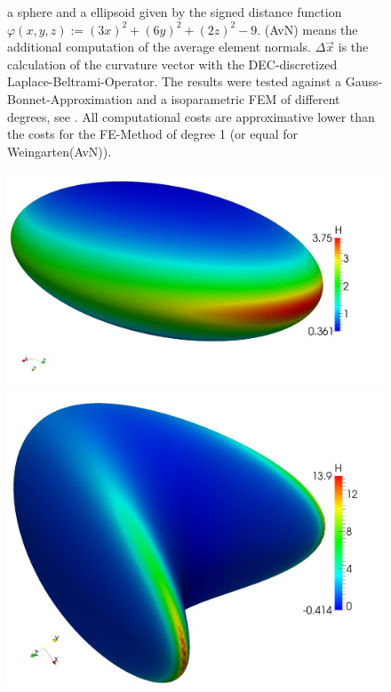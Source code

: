 \documentclass[a2paper]{scrartcl}
\begin{document}
\begin{figure}[h!]
{             a sphere and a ellipsoid given by the signed distance function \(  \varphi(x,y,z) := (3x)^{2} + (6y)^{2} + (2z)^{2} - 9  \).
             (AvN) means the additional computation of the average element normals.
             \( \Delta\vec{x} \) is the calculation of the curvature vector with the DEC-discretized Laplace-Beltrami-Operator.
             The results were tested against a \mbox{Gauss-Bonnet-Approximation} and a isoparametric FEM of different degrees, see \cite{heine}.
             All computational costs are approximative lower than the costs for the FE-Method of degree 1 (or equal for Weingarten(AvN)).
             }
    \begin{minipage}[t]{0.24\textwidth}
       \centering\includegraphics[width=\textwidth]{bilder/EllipsoidMean.png}
    \end{minipage}\hfill
    \begin{minipage}[t]{0.24\textwidth}
       \centering\includegraphics[width=\textwidth]{bilder/QuarticMean.png}

\end{minipage}
\end{figure}
\end{document}
